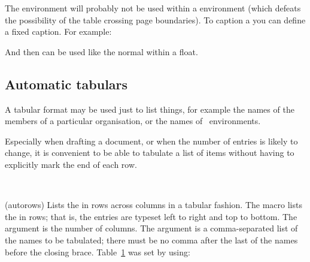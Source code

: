 {{{{{{    The  environment will probably not be used within
a  environment (which defeats the possibility of the table
crossing page boundaries). To caption a  you can define a 
fixed caption. 
For example:
\begin{lcode}
\end{lcode}
And then \cmd{\freetabcaption} can be used like the normal \cmd{\caption}
within a  float.


\subsection{Automatic tabulars}

    A tabular format may be used just to list things, for example the
names of the members of a particular organisation, or the names of
\ltx\ environments. 


    Especially when drafting a document, or when the number of entries
is likely to change, it is convenient to be able to tabulate a list
of items without having to explicitly mark the end of each row.

\begin{syntax}
\cmd{\autorows} \\
\end{syntax}
\glossary(autorows)%
  {}%
  {Lists the  in rows across  columns in a tabular 
   fashion.}
The \cmd{\autorows} macro lists the  in rows; that is,
the entries are typeset left to right and top to bottom. The
 argument is the number of columns.
The  argument is a comma-separated list of the names to be
tabulated; there must be no comma after the last of the names before the
closing brace.
Table~\ref{tab:autorows} was set by \cmd{\autorows} using:
\begin{lcode}
\begin{figure}
               \label{tab:autorows}
\end{figure}
\end{lcode}

}}}}}}
